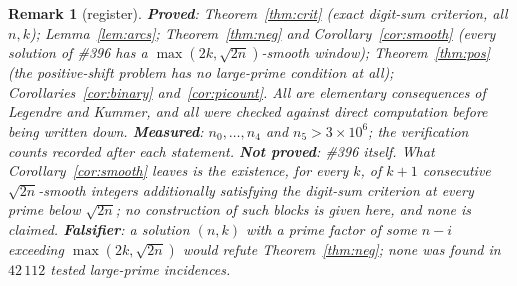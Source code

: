 \documentclass[11pt]{article}
\newtheorem{remark}[theorem]{Remark}
\begin{document}
\begin{remark}[register]
\textbf{Proved}: Theorem~\ref{thm:crit} (exact digit-sum criterion, all $n,k$);
Lemma~\ref{lem:arcs}; Theorem~\ref{thm:neg} and Corollary~\ref{cor:smooth} (every solution
of \#396 has a $\max(2k,\sqrt{2n})$-smooth window); Theorem~\ref{thm:pos} (the positive-shift
problem has no large-prime condition at all); Corollaries~\ref{cor:binary}
and~\ref{cor:picount}.  All are elementary consequences of Legendre and Kummer, and all
were checked against direct computation before being written down.
\textbf{Measured}: $n_0,\dots,n_4$ and $n_5>3\times10^{6}$; the verification counts
recorded after each statement.
\textbf{Not proved}: \#396 itself.  What Corollary~\ref{cor:smooth} leaves is the
existence, for every $k$, of $k+1$ consecutive $\sqrt{2n}$-smooth integers additionally
satisfying the digit-sum criterion at every prime below $\sqrt{2n}$; no construction of
such blocks is given here, and none is claimed.
\textbf{Falsifier}: a solution $(n,k)$ with a prime factor of some $n-i$ exceeding
$\max(2k,\sqrt{2n})$ would refute Theorem~\ref{thm:neg}; none was found in
$42\,112$ tested large-prime incidences.
\end{remark}
\end{document}
